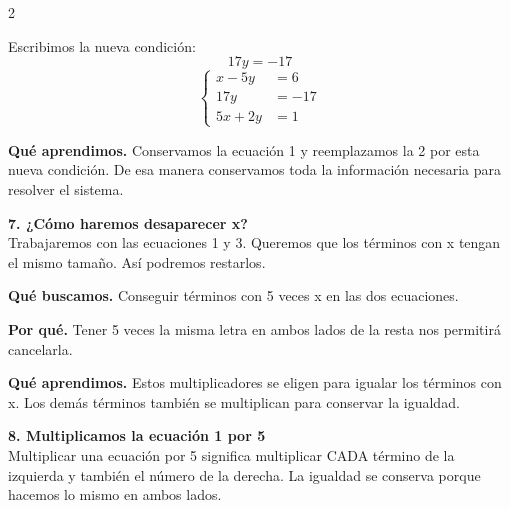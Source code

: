\documentclass[11pt,a4paper,landscape]{article}
\begin{document}
\begin{multicols*}{2}
\begin{minipage}{\linewidth}
\par\smallskip Escribimos la nueva condición:
\[17y = -17\]
\[\left\{\begin{aligned}x - 5y &= 6\\17y &= -17\\5x + 2y &= 1\end{aligned}\right.\]
\par\smallskip\textbf{Qué aprendimos.} Conservamos la ecuación 1 y reemplazamos la 2 por esta nueva condición. De esa manera conservamos toda la información necesaria para resolver el sistema.
\end{minipage}\par\medskip
\noindent\begin{minipage}{\linewidth}\textbf{7. ¿Cómo haremos desaparecer x?}\\[2pt]Trabajaremos con las ecuaciones 1 y 3. Queremos que los términos con x tengan el mismo tamaño. Así podremos restarlos.
\par\smallskip\textbf{Qué buscamos.} Conseguir términos con 5 veces x en las dos ecuaciones.
\par\smallskip\textbf{Por qué.} Tener 5 veces la misma letra en ambos lados de la resta nos permitirá cancelarla.
\par{}\par\smallskip
\par\smallskip\textbf{Qué aprendimos.} Estos multiplicadores se eligen para igualar los términos con x. Los demás términos también se multiplican para conservar la igualdad.
\end{minipage}\par\medskip
\noindent\begin{minipage}{\linewidth}\textbf{8. Multiplicamos la ecuación 1 por 5}\\[2pt]Multiplicar una ecuación por 5 significa multiplicar CADA término de la izquierda y también el número de la derecha. La igualdad se conserva porque hacemos lo mismo en ambos lados.

\end{minipage}
\end{multicols*}
\end{document}
